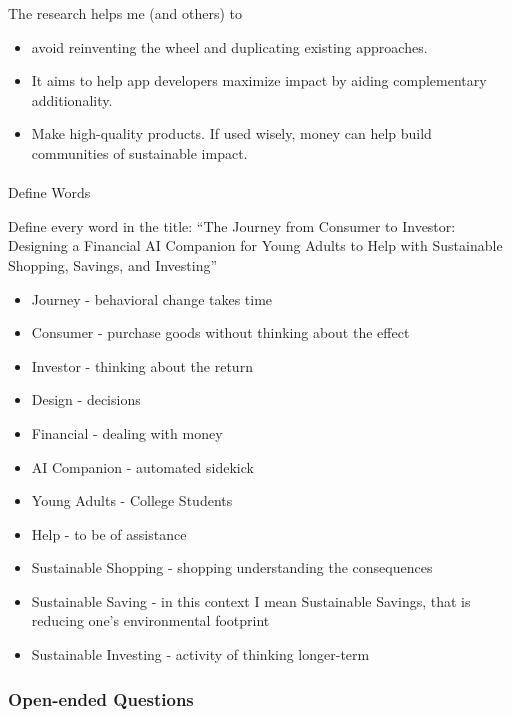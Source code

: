 \documentclass[
  letterpaper,
  DIV=11,
  numbers=noendperiod]{scrartcl}
\makeatletter
\let\oldparagraph\paragraph
\renewcommand{\paragraph}{
    \@ifstar
      \xxxParagraphStar
      \xxxParagraphNoStar
  }
\newcommand{\xxxParagraphStar}[1]{\oldparagraph*{#1}\mbox{}}
\newcommand{\xxxParagraphNoStar}[1]{\oldparagraph{#1}\mbox{}}
\providecommand{\tightlist}{%
  \setlength{\itemsep}{0pt}\setlength{\parskip}{0pt}}\usepackage{longtable,booktabs,array}
\makeatother
\begin{document}
The research helps me (and others) to

\begin{itemize}
\item
  avoid reinventing the wheel and duplicating existing approaches.
\item
  It aims to help app developers maximize impact by aiding complementary
  additionality.
\end{itemize}

\begin{itemize}
\tightlist
\item
  Make high-quality products. If used wisely, money can help build
  communities of sustainable impact.
\end{itemize}

\paragraph{Define Words}\label{define-words}

Define every word in the title: ``The Journey from Consumer to Investor:
Designing a Financial AI Companion for Young Adults to Help with
Sustainable Shopping, Savings, and Investing''

\begin{itemize}
\tightlist
\item
  Journey - behavioral change takes time
\item
  Consumer - purchase goods without thinking about the effect
\item
  Investor - thinking about the return
\item
  Design - decisions
\item
  Financial - dealing with money
\item
  AI Companion - automated sidekick
\item
  Young Adults - College Students
\item
  Help - to be of assistance
\item
  Sustainable Shopping - shopping understanding the consequences
\item
  Sustainable Saving - in this context I mean Sustainable Savings, that
  is reducing one's environmental footprint
\item
  Sustainable Investing - activity of thinking longer-term
\end{itemize}

\subsubsection{Open-ended Questions}\label{open-ended-questions}
\end{document}
